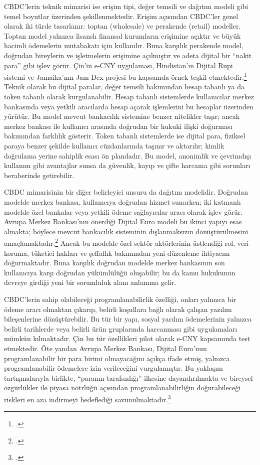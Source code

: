\documentclass[a4paper,12pt]{article}
\begin{document}
CBDC’lerin teknik mimarisi ise erişim tipi, değer temsili ve dağıtım modeli gibi temel boyutlar üzerinden şekillenmektedir. Erişim açısından CBDC’ler genel olarak iki türde tasarlanır: toptan (wholesale) ve perakende (retail) modeller. Toptan model yalnızca lisanslı finansal kurumların erişimine açıktır ve büyük hacimli ödemelerin mutabakatı için kullanılır. Buna karşılık perakende model, doğrudan bireylerin ve işletmelerin erişimine açılmıştır ve adeta dijital bir “nakit para” gibi işlev görür. Çin’in e-CNY uygulaması, Hindistan’ın Dijital Rupi sistemi ve Jamaika’nın Jam-Dex projesi bu kapsamda örnek teşkil etmektedir.\footcite{imf2023retail} Teknik olarak bu dijital paralar, değer temsili bakımından hesap tabanlı ya da token tabanlı olarak kurgulanabilir. Hesap tabanlı sistemlerde kullanıcılar merkez bankasında veya yetkili aracılarda hesap açarak işlemlerini bu hesaplar üzerinden yürütür. Bu model mevcut bankacılık sistemine benzer nitelikler taşır; ancak merkez bankası ile kullanıcı arasında doğrudan bir hukuki ilişki doğurması bakımından farklılık gösterir. Token tabanlı sistemlerde ise dijital para, fiziksel paraya benzer şekilde kullanıcı cüzdanlarında taşınır ve aktarılır; kimlik doğrulama yerine sahiplik esası ön plandadır. Bu model, anonimlik ve çevrimdışı kullanım gibi avantajlar sunsa da güvenlik, kayıp ve çifte harcama gibi sorunları beraberinde getirebilir.

CBDC mimarisinin bir diğer belirleyici unsuru da dağıtım modelidir. Doğrudan modelde merkez bankası, kullanıcıya doğrudan hizmet sunarken; iki katmanlı modelde özel bankalar veya yetkili ödeme sağlayıcılar aracı olarak işlev görür. Avrupa Merkez Bankası'nın önerdiği Dijital Euro modeli bu ikinci yapıyı esas almakta; böylece mevcut bankacılık sisteminin dışlanmaksızın dönüştürülmesini amaçlamaktadır.\footcite{ecb2023design} Ancak bu modelde özel sektör aktörlerinin üstlendiği rol, veri koruma, tüketici hakları ve şeffaflık bakımından yeni düzenleme ihtiyacını doğurmaktadır. Buna karşılık doğrudan modelde merkez bankasının son kullanıcıya karşı doğrudan yükümlülüğü oluşabilir; bu da kamu hukukunun devreye girdiği yeni bir sorumluluk alanı anlamına gelir.

CBDC’lerin sahip olabileceği programlanabilirlik özelliği, onları yalnızca bir ödeme aracı olmaktan çıkarıp, belirli koşullara bağlı olarak çalışan yazılım bileşenlerine dönüştürebilir. Bu tür bir yapı, sosyal yardım ödemelerinin yalnızca belirli tarihlerde veya belirli ürün gruplarında harcanması gibi uygulamaları mümkün kılmaktadır. Çin bu tür özellikleri pilot olarak e-CNY kapsamında test etmektedir. Öte yandan Avrupa Merkez Bankası, Dijital Euro'nun programlanabilir bir para birimi olmayacağını açıkça ifade etmiş, yalnızca programlanabilir ödemelere izin verileceğini vurgulamıştır. Bu yaklaşım tartışmalarıyla birlikte, “paranın tarafsızlığı” ilkesine dayandırılmakta ve bireysel özgürlükler ile piyasa nötrlüğü açısından programlanabilirliğin doğurabileceği riskleri en aza indirmeyi hedeflediği savunulmaktadır.\footcite{ecb2023digital}
\end{document}
